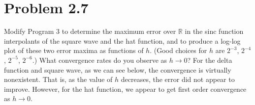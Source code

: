\documentclass{article}
\begin{document}
\section*{Problem 2.7}
Modify Program 3 to determine the maximum error over $\mathbb{R}$ in the sinc function interpolants of the square wave and the hat function, and to produce a log-log plot of these two error maxima as functions of $h$. (Good choices for $h$ are $2^{-3}$, $2^{-4}$, $2^{-5}$, $2^{-6}$.) What convergence rates do you observe as $h \to 0$?
\newline\newline
For the delta function and square wave, as we can see below, the convergence is virtually nonexistent. That is, as the value of $h$ decreases, the error did not appear to improve. However, for the hat function, we appear to get first order convergence as $h \to 0$.
\end{document}
